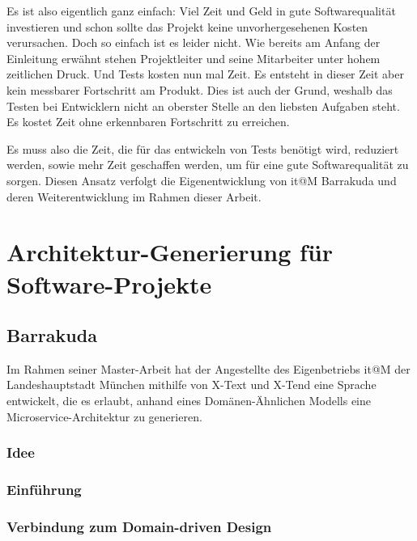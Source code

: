 \documentclass[12pt,a4paper,bibliography=totocnumbered,listof=totocnumbered]{scrartcl}
\begin{document}
Es ist also eigentlich ganz einfach: Viel Zeit und Geld in gute Softwarequalität investieren und schon sollte das Projekt keine unvorhergesehenen Kosten verursachen. Doch so einfach ist es leider nicht.
Wie bereits am Anfang der Einleitung erwähnt stehen Projektleiter und seine Mitarbeiter unter hohem zeitlichen Druck. Und Tests kosten nun mal Zeit. Es entsteht in dieser Zeit aber kein messbarer Fortschritt am Produkt. Dies ist auch der Grund, weshalb das Testen bei Entwicklern nicht an oberster Stelle an den liebsten Aufgaben steht. Es kostet Zeit ohne erkennbaren Fortschritt zu erreichen.

Es muss also die Zeit, die für das entwickeln von Tests benötigt wird, reduziert werden, sowie mehr Zeit geschaffen werden, um für eine gute Softwarequalität zu sorgen. Diesen Ansatz verfolgt die Eigenentwicklung von it@M Barrakuda und deren Weiterentwicklung im Rahmen dieser Arbeit.

\section{Architektur-Generierung für Software-Projekte}

\subsection{Barrakuda}

Im Rahmen seiner Master-Arbeit hat der Angestellte des Eigenbetriebs it@M der Landeshauptstadt München mithilfe von X-Text und X-Tend eine Sprache entwickelt, die es erlaubt, anhand eines Domänen-Ähnlichen Modells eine Microservice-Architektur zu generieren.

\subsubsection{Idee}

\subsubsection{Einführung}

\subsubsection{Verbindung zum Domain-driven Design}
\end{document}
